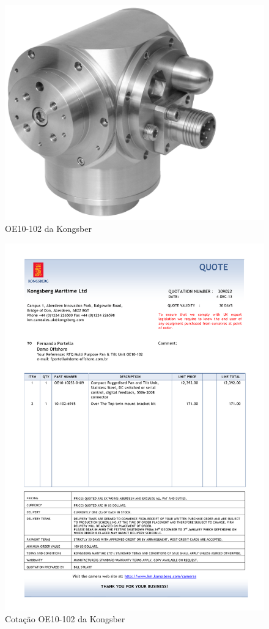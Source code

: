 \newpage

\begin{figure}[h!]
 \centering
 \includegraphics[width=1\columnwidth]{Pan_Tilt/foto}
 \caption{OE10-102 da Kongsber}
  
\end{figure}



\begin{figure}[h!]
\centering
\includegraphics[width=1\columnwidth]{Pan_Tilt/price_quote_0.pdf}
\caption{Cotação OE10-102 da Kongsber  } 
\end{figure}


